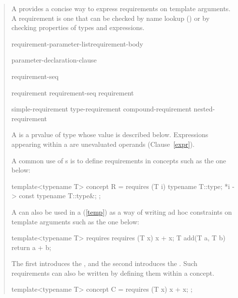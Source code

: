 \begin{quote}
\begin{addedblock}

\pnum
A  provides a concise way to express 
requirements on template arguments. 
% 
A requirement is one that can be checked by name lookup
() or by checking properties of types and expressions.

\begin{bnf}
\br
     requirement-parameter-list\opt requirement-body

\br
    \terminal{(} parameter-declaration-clause\opt~\terminal{)}
  
\br
    \terminal{\{} requirement-seq \terminal{\}}

\br
    requirement\br
    requirement-seq requirement

\br
    simple-requirement\br
    type-requirement\br
    compound-requirement\br
    nested-requirement
\end{bnf}

\pnum
A  is a prvalue of type  whose
value is described below.
Expressions appearing within a 
are unevaluated operands (Clause~\ref{expr}).

\pnum
\enterexample
A common use of s is to define
requirements in concepts such as the one below:
\begin{codeblock}
template<typename T>
  concept R = requires (T i) {
    typename T::type;
    {*i} -> const typename T::type&;
  };
\end{codeblock}
A  can also be used in a 
 (\ref{temp}) as a way of writing ad hoc 
constraints on template arguments such as the one below:
\begin{codeblock}
template<typename T>
  requires requires (T x) { x + x; }
    T add(T a, T b) { return a + b; }
\end{codeblock}
The first  introduces the 
, and the second
introduces the .
\exitexample
\enternote
Such requirements can also be written by defining them within
a concept.
\begin{codeblock}
template<typename T>
  concept C = requires (T x) { x + x; };


\end{codeblock}
\end{addedblock}
\end{quote}
